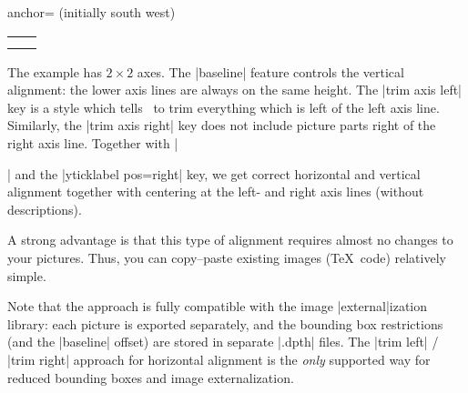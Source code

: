 \begin{pgfplotskey}{anchor= (initially south west)}
\begin{minipage}
\begin{tabular}
\begin{codeexample}[vbox]
\pgfplotsset{
	small,
	title=Requires experimental PGF!
}
\begin{center}
\begin{tabular}{rl}
	\begin{tikzpicture}[baseline,trim axis left]
		\begin{axis}
			\addplot {x};
		\end{axis}
	\end{tikzpicture}
	&
	\begin{tikzpicture}[baseline,trim axis right]
	\begin{axis}[
		ylabel={$f(x)=x^2$},
		yticklabel pos=right,
		ylabel style={font=\Huge}]
		\addplot {x^2};
	\end{axis}
	\end{tikzpicture}
	\\
	\begin{tikzpicture}[baseline,trim axis left]
	\begin{axis}[xlabel=$x$,xlabel style={font=\Huge}]
		\addplot {x^3};
	\end{axis}
	\end{tikzpicture}%
	&
	\begin{tikzpicture}[baseline,trim axis right]
	\begin{axis}[yticklabel pos=right]
		\addplot {x^4};
	\end{axis}
	\end{tikzpicture}%
	\\
\end{tabular}%
\end{center}
\end{codeexample}
\noindent The example has $2 \times 2$ axes. The |baseline| feature controls the vertical alignment: the lower axis lines are always on the same height. The |trim axis left| key is a style which tells \Tikz\ to trim everything which is left of the left axis line. Similarly, the |trim axis right| key does not include picture parts right of the right axis line. Together with |\begin{center}| and the |yticklabel pos=right| key, we get correct horizontal and vertical alignment together with centering at the left- and right axis lines (without descriptions).

A strong advantage is that this type of alignment requires almost no changes to your pictures. Thus, you can copy--paste existing images (\TeX\ code) relatively simple.

Note that the approach is fully compatible with the image |external|ization library: each picture is exported separately, and the bounding box restrictions (and the |baseline| offset) are stored in separate |.dpth| files. The |trim left| / |trim right| approach for horizontal alignment is the \emph{only} supported way for reduced bounding boxes and image externalization.


\end{center}
\end{tabular}
\end{minipage}
\end{pgfplotskey}
